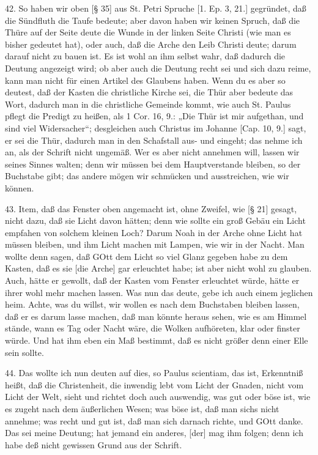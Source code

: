 42. So haben wir oben [§ 35] aus St. Petri Spruche [1. Ep. 3, 21.] gegründet, daß die Sündfluth die Taufe bedeute; aber davon haben wir keinen Spruch, daß die Thüre auf der Seite deute die Wunde in der linken Seite Christi (wie man es bisher gedeutet hat), oder auch, daß die Arche den Leib Christi deute; darum darauf nicht zu bauen ist. Es ist wohl an ihm selbst wahr, daß dadurch die Deutung angezeigt wird; ob aber auch die Deutung recht sei und sich dazu reime, kann man nicht für einen Artikel des Glaubens haben. Wenn du es aber so deutest, daß der Kasten die christliche Kirche sei, die Thür aber bedeute das Wort, dadurch man in die christliche Gemeinde kommt, wie auch St. Paulus pflegt die Predigt zu heißen, als 1 Cor. 16, 9.: „Die Thür ist mir aufgethan, und sind viel Widersacher“; desgleichen auch Christus im Johanne [Cap. 10, 9.] sagt, er sei die Thür, dadurch man in den Schafstall aus- und eingeht; das nehme ich an, als der Schrift nicht ungemäß. Wer es aber nicht annehmen will, lassen wir seines Sinnes walten; denn wir müssen bei dem Hauptverstande bleiben, so der Buchstabe gibt; das andere mögen wir schmücken und ausstreichen, wie wir können.

43. Item, daß das Fenster oben angemacht ist, ohne Zweifel, wie [§ 21] gesagt, nicht dazu, daß sie Licht davon hätten; denn wie sollte ein groß Gebäu ein Licht empfahen von solchem kleinen Loch? Darum Noah in der Arche ohne Licht hat müssen bleiben, und ihm Licht machen mit Lampen, wie wir in der Nacht. Man wollte denn sagen, daß GOtt dem Licht so viel Glanz gegeben habe zu dem Kasten, daß es sie [die Arche] gar erleuchtet habe; ist aber nicht wohl zu glauben. Auch, hätte er gewollt, daß der Kasten vom Fenster erleuchtet würde, hätte er ihrer wohl mehr machen lassen. Was nun das deute, gebe ich auch einem jeglichen heim. Achte, was du willst, wir wollen es nach dem Buchstaben bleiben lassen, daß er es darum lasse machen, daß man könnte heraus sehen, wie es am Himmel stände, wann es Tag oder Nacht wäre, die Wolken aufhöreten, klar oder finster würde. Und hat ihm eben ein Maß bestimmt, daß es nicht größer denn einer Elle sein sollte.

44. Das wollte ich nun deuten auf dies, so Paulus scientiam, das ist, Erkenntniß heißt, daß die Christenheit, die inwendig lebt vom Licht der Gnaden, nicht vom Licht der Welt, sieht und richtet doch auch auswendig, was gut oder böse ist, wie es zugeht nach dem äußerlichen Wesen; was böse ist, daß man sichs nicht annehme; was recht und gut ist, daß man sich darnach richte, und GOtt danke. Das sei meine Deutung; hat jemand ein anderes, [der] mag ihm folgen; denn ich habe deß nicht gewissen Grund aus der Schrift.

